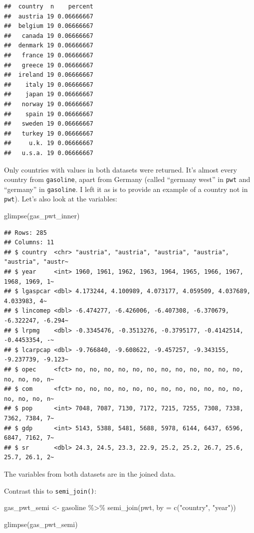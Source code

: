 \documentclass[
]{article}
\newenvironment{Shaded}{\begin{snugshade}}{\end{snugshade}}
\newcommand{\AttributeTok}[1]{\textcolor[rgb]{0.77,0.63,0.00}{#1}}
\newcommand{\FunctionTok}[1]{\textcolor[rgb]{0.00,0.00,0.00}{#1}}
\newcommand{\NormalTok}[1]{#1}
\newcommand{\OtherTok}[1]{\textcolor[rgb]{0.56,0.35,0.01}{#1}}
\newcommand{\SpecialCharTok}[1]{\textcolor[rgb]{0.00,0.00,0.00}{#1}}
\newcommand{\StringTok}[1]{\textcolor[rgb]{0.31,0.60,0.02}{#1}}
\begin{document}
\begin{verbatim}
##  country  n    percent
##  austria 19 0.06666667
##  belgium 19 0.06666667
##   canada 19 0.06666667
##  denmark 19 0.06666667
##   france 19 0.06666667
##   greece 19 0.06666667
##  ireland 19 0.06666667
##    italy 19 0.06666667
##    japan 19 0.06666667
##   norway 19 0.06666667
##    spain 19 0.06666667
##   sweden 19 0.06666667
##   turkey 19 0.06666667
##     u.k. 19 0.06666667
##   u.s.a. 19 0.06666667
\end{verbatim}

Only countries with values in both datasets were returned. It's almost every country from \texttt{gasoline},
apart from Germany (called ``germany west'' in \texttt{pwt} and ``germany'' in \texttt{gasoline}. I left it as is to
provide an example of a country not in \texttt{pwt}). Let's also look at the variables:

\begin{Shaded}
\begin{Highlighting}[]
\FunctionTok{glimpse}\NormalTok{(gas\_pwt\_inner)}
\end{Highlighting}
\end{Shaded}

\begin{verbatim}
## Rows: 285
## Columns: 11
## $ country  <chr> "austria", "austria", "austria", "austria", "austria", "austr~
## $ year     <int> 1960, 1961, 1962, 1963, 1964, 1965, 1966, 1967, 1968, 1969, 1~
## $ lgaspcar <dbl> 4.173244, 4.100989, 4.073177, 4.059509, 4.037689, 4.033983, 4~
## $ lincomep <dbl> -6.474277, -6.426006, -6.407308, -6.370679, -6.322247, -6.294~
## $ lrpmg    <dbl> -0.3345476, -0.3513276, -0.3795177, -0.4142514, -0.4453354, -~
## $ lcarpcap <dbl> -9.766840, -9.608622, -9.457257, -9.343155, -9.237739, -9.123~
## $ opec     <fct> no, no, no, no, no, no, no, no, no, no, no, no, no, no, no, n~
## $ com      <fct> no, no, no, no, no, no, no, no, no, no, no, no, no, no, no, n~
## $ pop      <int> 7048, 7087, 7130, 7172, 7215, 7255, 7308, 7338, 7362, 7384, 7~
## $ gdp      <int> 5143, 5388, 5481, 5688, 5978, 6144, 6437, 6596, 6847, 7162, 7~
## $ sr       <dbl> 24.3, 24.5, 23.3, 22.9, 25.2, 25.2, 26.7, 25.6, 25.7, 26.1, 2~
\end{verbatim}

The variables from both datasets are in the joined data.

Contrast this to \texttt{semi\_join()}:

\begin{Shaded}
\begin{Highlighting}[]
\NormalTok{gas\_pwt\_semi }\OtherTok{\textless{}{-}}\NormalTok{ gasoline }\SpecialCharTok{\%\textgreater{}\%}
  \FunctionTok{semi\_join}\NormalTok{(pwt, }\AttributeTok{by =} \FunctionTok{c}\NormalTok{(}\StringTok{"country"}\NormalTok{, }\StringTok{"year"}\NormalTok{))}

\FunctionTok{glimpse}\NormalTok{(gas\_pwt\_semi)}
\end{Highlighting}
\end{Shaded}
\end{document}

